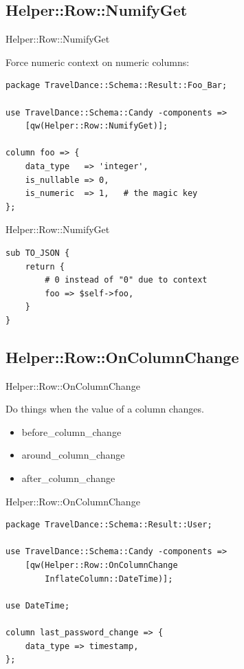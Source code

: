 \subsection{Helper::Row::NumifyGet}

\begin{frame}[fragile]{Helper::Row::NumifyGet}

Force numeric context on numeric columns:

\begin{lstlisting}
package TravelDance::Schema::Result::Foo_Bar;

use TravelDance::Schema::Candy -components =>
    [qw(Helper::Row::NumifyGet)];

column foo => {
    data_type   => 'integer',
    is_nullable => 0,
    is_numeric  => 1,   # the magic key
};
\end{lstlisting}
\end{frame}

\begin{frame}[fragile]{Helper::Row::NumifyGet}
\begin{lstlisting}
sub TO_JSON {
    return {
        # 0 instead of "0" due to context
        foo => $self->foo,  
    }
}
\end{lstlisting}
\end{frame}

\subsection{Helper::Row::OnColumnChange}

\begin{frame}[fragile]{Helper::Row::OnColumnChange}

Do things when the value of a column changes.

\begin{itemize}
\item before\_column\_change
\item around\_column\_change
\item after\_column\_change
\end{itemize}

\end{frame}

\begin{frame}[fragile]{Helper::Row::OnColumnChange}

\begin{lstlisting}
package TravelDance::Schema::Result::User;

use TravelDance::Schema::Candy -components =>
    [qw(Helper::Row::OnColumnChange 
        InflateColumn::DateTime)];

use DateTime;

column last_password_change => {
    data_type => timestamp,
};
\end{lstlisting}
\end{frame}

